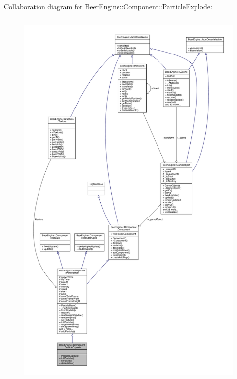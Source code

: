 Collaboration diagram for Beer\+Engine\+:\+:Component\+:\+:Particle\+Explode\+:\nopagebreak
\begin{figure}[H]
\begin{center}
\leavevmode
\includegraphics[height=550pt]{class_beer_engine_1_1_component_1_1_particle_explode__coll__graph}
\end{center}
\end{figure}
